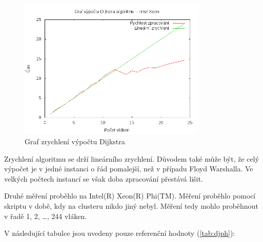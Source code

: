 \documentclass[a4paper,10pt]{article}
\begin{document}
\begin{figure}[H]
  \centering
    \includegraphics[width=0.8\textwidth]{graf_dijkstra_intel.png}
  \caption{Graf zrychlení výpočtu Dijkstra}
  \label{fig:dijk}
\end{figure}

Zrychlení algoritmu se drží lineárního zrychlení. Důvodem také může být, že celý výpočet je v jedné instanci o řád pomalejší, než v případu Floyd Warshalla. Ve velkých počtech instancí se však doba zpracování přestává lišit.

Druhé měření proběhlo na Intel(R) Xeon(R) Phi(TM). Měření proběhlo pomocí skriptu v době, kdy na clusteru nikdo jiný nebyl. Měření tedy mohlo proběhnout v řadě 1, 2, \dots , 244 vláken.

V následující tabulce jsou uvedeny pouze referenční hodnoty (\ref{tab:djph}):
\end{document}
